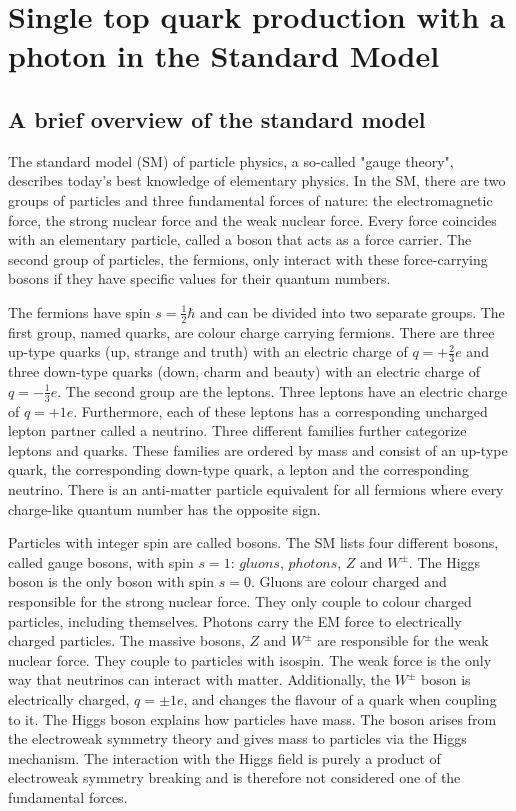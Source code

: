 
\chapter{Single top quark production with a photon in the Standard Model}
\section{A brief overview of the standard model}

The standard model (SM) of particle physics, a so-called "gauge theory",  describes today's best knowledge of elementary physics. 
In the SM, there are two groups of particles and three fundamental forces of nature: the electromagnetic force, the strong nuclear force and the weak nuclear force. 
Every force coincides with an elementary particle, called a boson that acts as a force carrier. The second group of particles, the fermions, only interact with these force-carrying bosons if they have specific values for their quantum numbers.

The fermions have spin $s = \frac{1}{2} \hbar$ and can be divided into two separate groups. The first group, named quarks, are colour charge carrying fermions. 
There are three up-type quarks (up, strange and truth) with an electric charge of $q = +\frac{2}{3}e$ and three down-type quarks (down, charm and beauty) with an electric charge of $q = -\frac{1}{3}e$. 
The second group are the leptons. Three leptons have an electric charge of $q = +1e$. Furthermore, each of these leptons has a corresponding uncharged lepton partner called a neutrino.
Three different families further categorize leptons and quarks. These families are ordered by mass and consist of an up-type quark, the corresponding down-type quark, a lepton and the corresponding neutrino. 
There is an anti-matter particle equivalent for all fermions where every charge-like quantum number has the opposite sign. 

Particles with integer spin are called bosons. The SM lists four different bosons, called gauge bosons, with spin $s = 1$: $gluons$, $photons$, $Z$ and $W^{\pm}$. The Higgs boson is the only boson with spin $s=0$.
Gluons are colour charged and responsible for the strong nuclear force. They only couple to colour charged particles, including themselves. Photons carry the EM force to electrically charged particles. The massive bosons, $Z$ and $W^{\pm}$ are responsible for the weak nuclear force. They couple to particles with isospin. The weak force is the only way that neutrinos can interact with matter. Additionally, the $W^{\pm}$ boson is electrically charged, $q = \pm 1e$, and changes the flavour of a quark when coupling to it.
The Higgs boson explains how particles have mass. The boson arises from the electroweak symmetry theory and gives mass to particles via the Higgs mechanism. The interaction with the Higgs field is purely a product of electroweak symmetry breaking and is therefore not considered one of the fundamental forces.

